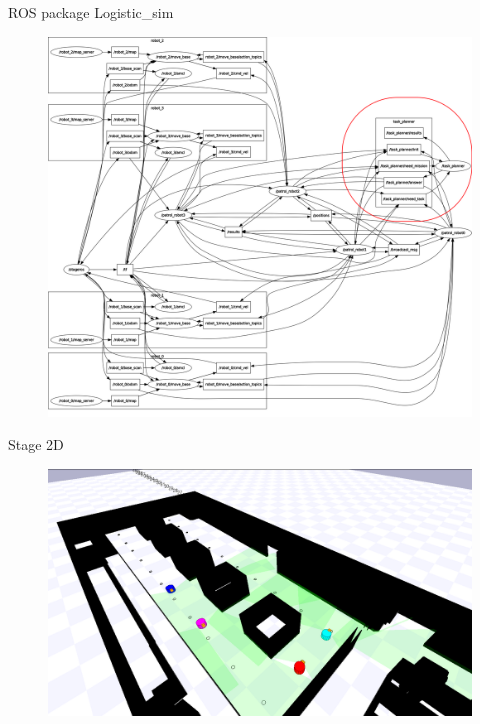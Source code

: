   
      \begin{frame}[fragile]{ROS package Logistic\_sim}
        \begin{figure}[hbt]
            \centering
            \includegraphics[scale=0.12]{img/rosgraph1}
        \end{figure}
    \end{frame}

    \begin{frame}{Stage 2D}
        \begin{figure}[hbt]
            \centering
            \includegraphics[width=\textwidth]{img/prospective}
        \end{figure}
    \end{frame}

